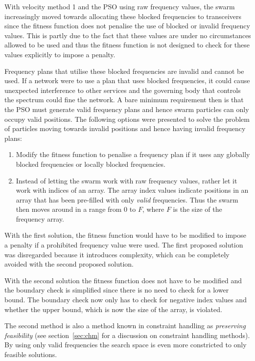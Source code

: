 With velocity method 1 and the \gls{PSO} using raw frequency values, the swarm increasingly moved towards allocating these blocked frequencies to transceivers since the fitness function does not penalise the use of blocked or invalid frequency values. This is partly due to the fact that these values are under no circumstances allowed to be used and thus the fitness function is not designed to check for these values explicitly to impose a penalty.

Frequency plans that utilise these blocked frequencies are invalid and cannot be used. If a network were to use a plan that uses blocked frequencies, it could cause unexpected interference to other services and the governing body that controls the spectrum could fine the network. A bare minimum requirement then is that the \gls{PSO} must generate valid frequency plans and hence swarm particles can only occupy valid positions. The following options were presented to solve the problem of particles moving towards invalid positions and hence having invalid frequency plans:
\begin{enumerate}
\item Modify the fitness function to penalise a frequency plan if it uses any globally blocked frequencies or locally blocked frequencies.
\item Instead of letting the swarm work with raw frequency values, rather let it work with indices of an array. The array index values indicate positions in an array that has been pre-filled with only \emph{valid} frequencies. Thus the swarm then moves around in a range from 0 to $F$, where $F$ is the size of the frequency array.
\end{enumerate}

With the first solution, the fitness function would have to be modified to impose a penalty if a prohibited frequency value were used. The first proposed solution was disregarded because it introduces complexity, which can be completely avoided with the second proposed solution.

With the second solution the fitness function does not have to be modified and the boundary check is simplified since there is no need to check for a lower bound. The boundary check now only has to check for negative index values and whether the upper bound, which is now the size of the array, is violated. 

The second method is also a method known in constraint handling as \emph{preserving feasibility} (see section~\ref{sec:chm} for a discussion on constraint handling methods). By using only valid frequencies the search space is even more constricted to only feasible solutions.



